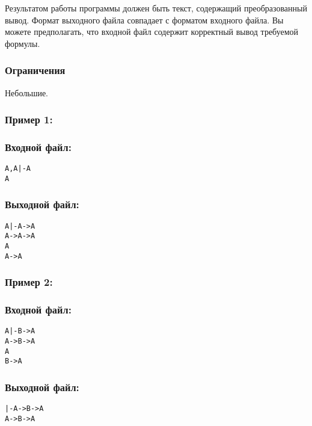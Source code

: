 \documentclass[11pt,a4paper,oneside]{article}
\begin{document}
Результатом работы программы должен быть текст, содержащий преобразованный вывод.
Формат выходного файла совпадает с форматом входного файла.
Вы можете предполагать, что входной файл содержит корректный вывод требуемой формулы.

\subsubsection*{Ограничения}
Небольшие.

\subsubsection*{Пример 1:}
\begin{minipage}[t]{.5\textwidth}
\subsubsection*{Входной файл:}
\begin{verbatim}
A,A|-A
A
\end{verbatim}
\end{minipage}
\begin{minipage}[t]{.5\textwidth}
\subsubsection*{Выходной файл:}
\begin{verbatim}
A|-A->A
A->A->A
A
A->A
\end{verbatim}
\end{minipage}

\subsubsection*{Пример 2:}
\begin{minipage}[t]{.5\textwidth}
\subsubsection*{Входной файл:}
\begin{verbatim}
A|-B->A
A->B->A
A
B->A
\end{verbatim}
\end{minipage}
\begin{minipage}[t]{.5\textwidth}
\subsubsection*{Выходной файл:}
\begin{verbatim}
|-A->B->A
A->B->A
\end{verbatim}
\end{minipage}
\end{document}
